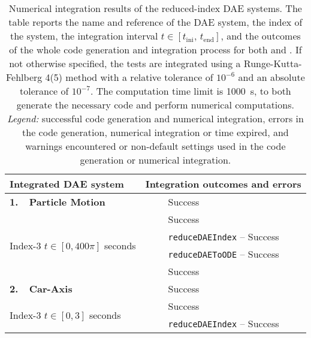 \setlength\tabcolsep{2.5pt}
\setlength{\LTcapwidth}{\textwidth}
{\footnotesize\centering\begin{longtable}{lccl}
  \caption{Numerical integration results of the reduced-index \ac{DAE} systems. The table reports the name and reference of the \ac{DAE} system, the index of the system, the integration interval $t \in [t_{\text{ini}}, \, t_{\text{end}}]$, and the outcomes of the whole code generation and integration process for both \Maple{} and \Indigo{}. If not otherwise specified, the tests are integrated using a Runge-Kutta-Fehlberg 4(5) method with a relative tolerance of $10^{-6}$ and an absolute tolerance of $10^{-7}$. The computation time limit is \SI{1000}{\second}, to both generate the necessary code and perform numerical computations. \emph{Legend:} \mycheckmark{} successful code generation and numerical integration, \mycrossmark{} errors in the code generation, numerical integration or time expired, and \mywarnmark{} warnings encountered or non-default settings used in the code generation or numerical integration.}
  \label{chap5:tab:numerical_integration}
  \endfirsthead
  \endhead
  \toprule
  \textbf{Integrated \ac{DAE} system} &
  \multicolumn{3}{l}{\textbf{Integration outcomes and errors}} \\
  \midrule
  \multirow{1}{*}{\textbf{1.~~Particle Motion~\cite{campbell1995constraint}}}
    & \Maple{}       & \mycheckmark{}\phantom{\mywarnmark{}} & Success \\ \cmidrule{2-4}
    \multirow{4}{*}{Index-3 \quad $t \in [0, 400\pi]$ seconds} & \Mathematica{} & \mycheckmark{}\phantom{\mywarnmark{}} & Success \\ \cmidrule{2-4}
    & \multirow{2}{*}{\Matlab{}} & \mycheckmark{}\phantom{\mywarnmark{}} & \texttt{reduceDAEIndex} -- Success \\ \cmidrule{3-4}
    &                            & \mycheckmark{}\phantom{\mywarnmark{}} & \texttt{reduceDAEToODE} -- Success \\ \cmidrule{2-4}\cmidrule{2-4}
    & \Indigo{} & \mycheckmark{}\phantom{\mywarnmark{}} & Success \\ \midrule
  \multirow{1}{*}{\textbf{2.~~Car-Axis~\cite{lioen1998test, mazzia2008test}}}
    & \Maple{}       & \mycheckmark{}\phantom{\mywarnmark{}} & Success \\ \cmidrule{2-4}
    \multirow{4}{*}{Index-3 \quad $t \in [0, 3]$ seconds} & \Mathematica{} & \mycheckmark{}\phantom{\mywarnmark{}} & Success \\ \cmidrule{2-4}
    & \multirow{2}{*}{\Matlab{}} & \mycheckmark{}\phantom{\mywarnmark{}} & \texttt{reduceDAEIndex} -- Success \\ \cmidrule{3-4}

\end{longtable}}

